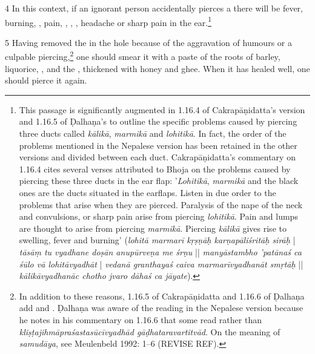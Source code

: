 \begin{translation}
    \item [4] In this context, if an ignorant person accidentally pierces a 
     there will 
    be fever, burning, , pain, , 
    , 
    , headache or sharp pain in the ear.\footnote{This passage is significantly augmented in 1.16.4 of Cakrapāṇidatta's version \citep[126]{acar-1939} and 1.16.5 of Ḍalhaṇa's \citep[77]{vulgate} to outline the specific problems caused by piercing three ducts called \emph{kālikā}, \emph{marmikā} and \emph{lohitikā}. In fact, the order of the problems mentioned in the Nepalese version has been retained in the other versions and divided between each duct. Cakrapāṇidatta's commentary on 1.16.4 \citep[126]{acar-1939} cites several verses attributed to Bhoja on the problems caused by piercing these three ducts in the ear flap: '\emph{Lohitikā}, \emph{marmikā} and the black ones are the ducts situated in the earflaps.  Listen in due order to the problems that arise when they are pierced. Paralysis of the nape of the neck and convulsions, or sharp pain arise from piercing \emph{lohitikā}. Pain and lumps are thought to arise from piercing \emph{marmikā}. Piercing \emph{kālikā} gives rise to swelling, fever and burning' (\emph{lohitā marmarī kṛṣṇāḥ karṇapāliśritāḥ sirāḥ} | \emph{tāsāṃ tu vyadhane doṣān anupūrveṇa me śrṇu} || \emph{manyāstambho 'patānaś ca śūlo vā lohitāvyadhāt} | \emph{vedanā granthayaś caiva marmarīvyadhanāt smṛtāḥ} || \emph{kālikāvyadhanāc chotho jvaro dāhaś ca jāyate}).}
    
    \item[5]     Having removed the  in the hole because of the aggravation of humours or a culpable piercing,\footnote{In addition to these reasons, 1.16.5 of Cakrapāṇidatta \citep[126–127]{acar-1939} and 1.16.6 of Ḍalhaṇa \citep[77]{vulgate} add  and . Ḍalhaṇa was aware of the reading in the Nepalese version because he notes in his commentary on 1.16.6 \citep[77]{vulgate} that some read  rather than \emph{kliṣṭajihmāpraśastasūcīvyadhād gāḍhatara\-vartitvād}. On the meaning of \emph{samudāya}, see Meulenbeld 1992: 1–6 (REVISE REF).} one should smear it with
    a paste of the roots of 
    barley, 
    liquorice, 
    , and the
    ,
    thickened with honey and ghee. When it has healed well, one should pierce it again.
    

\end{translation}
